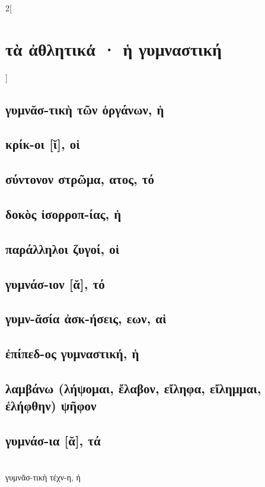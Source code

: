\documentclass{book}
\begin{document}
\begin{multicols}{2}[\section{τὰ ἀθλητικά · ἡ γυμναστική}]
\subsection{γυμνᾰσ-τικὴ τῶν ὀργάνων, ἡ}
\subsection{κρίκ-οι [ῐ], οἱ}
\subsection{σύντονον στρῶμα, ατος, τό}
\subsection{δοκὸς ἰσορροπ-ίας, ἡ}
\subsection{παράλληλοι ζυγοί, οἱ}
\subsection{γυμνάσ-ιον [ᾰ], τό}
\subsection{γυμν-ᾰσία ἀσκ-ήσεις, εων, αἱ}
\subsection{ἐπίπεδ-ος γυμναστική, ἡ}
\subsection{λαμβάνω (λήψομαι, ἔλαβον, εἴληφα, εἴλημμαι, ἐλήφθην) ψῆφον}
\subsection{γυμνάσ-ια [ᾰ], τά}
 ~\\
γυμνᾰσ-τικὴ τέχν-η, ἡ 

\end{multicols}
\end{document}
